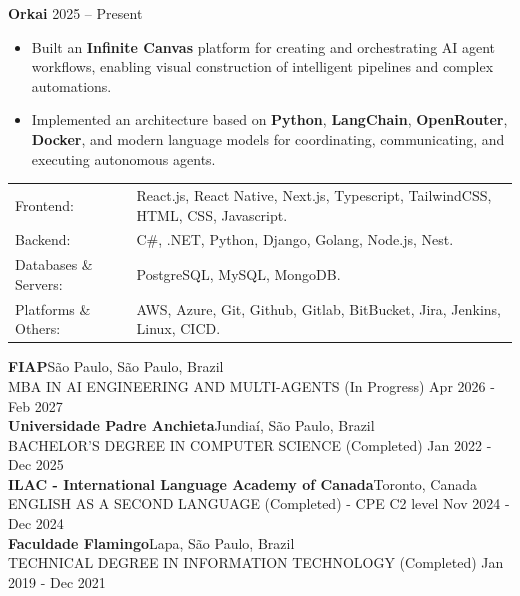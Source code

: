     \textbf{Orkai} \hfill  2025 -- Present\\
    \vspace{-3mm}
    \begin{itemize} \itemsep -3pt
        \item Built an \textbf{Infinite Canvas} platform for creating and orchestrating AI agent workflows, enabling visual construction of intelligent pipelines and complex automations.
        \item Implemented an architecture based on \textbf{Python}, \textbf{LangChain}, \textbf{OpenRouter}, \textbf{Docker}, and modern language models for coordinating, communicating, and executing autonomous agents.
    \end{itemize}
    

    \vspace{2mm}
    \begin{longtable}{p{4cm}p{12cm}}
        Frontend: & React.js, React Native, Next.js, Typescript, TailwindCSS, HTML, CSS, Javascript. \\
        Backend: & C\#, .NET, Python, Django, Golang, Node.js, Nest. \\
        Databases \& Servers: & PostgreSQL, MySQL, MongoDB. \\
        Platforms \& Others: &  AWS, Azure, Git, Github, Gitlab, BitBucket, Jira, Jenkins, Linux, CICD. \\
    \end{longtable}
    \vspace{1mm}

    \vspace{2mm}
    \textbf{FIAP}\hfill São Paulo, São Paulo, Brazil\\
    MBA IN AI ENGINEERING AND MULTI-AGENTS (In Progress) \hfill Apr 2026 - Feb 2027\\
    \vspace{2mm}
    \textbf{Universidade Padre Anchieta}\hfill Jundiaí, São Paulo, Brazil\\
    BACHELOR'S DEGREE IN COMPUTER SCIENCE (Completed) \hfill Jan 2022 - Dec 2025\\
    \vspace{2mm}
    \textbf{ILAC - International Language Academy of Canada}\hfill Toronto, Canada\\
    ENGLISH AS A SECOND LANGUAGE (Completed) - CPE C2 level \hfill Nov 2024 - Dec 2024\\
    \vspace{2mm}
    \textbf{Faculdade Flamingo}\hfill Lapa, São Paulo, Brazil\\
    TECHNICAL DEGREE IN INFORMATION TECHNOLOGY (Completed) \hfill Jan 2019 - Dec 2021\\


